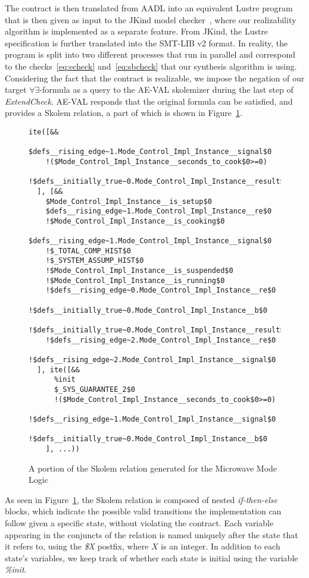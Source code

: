 The contract is then translated from AADL into an equivalent Lustre program that
is then given as input to the JKind model checker~\cite{jkind}, where our
realizability algorithm is implemented as a separate feature. From JKind, the
Lustre specification is further translated into the SMT-LIB v2 format. In
reality, the program is split into two different processes that run in parallel and correspond to the
checks~\ref{eq:echeck} and~\ref{eq:sbcheck} that our synthesis algorithm is
using. Considering the fact that the
contract is realizable, we impose the negation of our target
$\forall\exists$-formula as a query to the AE-VAL skolemizer during the last
step of \textit{ExtendCheck}. AE-VAL responds that the original formula can be
satisfied, and provides a Skolem relation, a part of which is shown in Figure~\ref{fig:skolem-rel}.

\begin{figure}
\begin{Verbatim}[obeytabs,fontsize=\tiny]
ite([&&
    $defs__rising_edge~1.Mode_Control_Impl_Instance__signal$0
    !($Mode_Control_Impl_Instance__seconds_to_cook$0>=0)
    !$defs__initially_true~0.Mode_Control_Impl_Instance__result$0
  ], [&&
    $Mode_Control_Impl_Instance__is_setup$0
    $defs__rising_edge~1.Mode_Control_Impl_Instance__re$0
    !$Mode_Control_Impl_Instance__is_cooking$0
    $defs__rising_edge~1.Mode_Control_Impl_Instance__signal$0
    !$_TOTAL_COMP_HIST$0
    !$_SYSTEM_ASSUMP_HIST$0
    !$Mode_Control_Impl_Instance__is_suspended$0
    !$Mode_Control_Impl_Instance__is_running$0
    !$defs__rising_edge~0.Mode_Control_Impl_Instance__re$0
    !$defs__initially_true~0.Mode_Control_Impl_Instance__b$0
    !$defs__initially_true~0.Mode_Control_Impl_Instance__result$0
    !$defs__rising_edge~2.Mode_Control_Impl_Instance__re$0
    !$defs__rising_edge~2.Mode_Control_Impl_Instance__signal$0
  ], ite([&&
      %init
      $_SYS_GUARANTEE_2$0
      !($Mode_Control_Impl_Instance__seconds_to_cook$0>=0)
      !$defs__rising_edge~1.Mode_Control_Impl_Instance__signal$0
      !$defs__initially_true~0.Mode_Control_Impl_Instance__b$0
    ], ...))
\end{Verbatim}
\caption{A portion of the Skolem relation generated for the Microwave Mode Logic}
\label{fig:skolem-rel}
\end{figure}
As seen in Figure~\ref{fig:skolem-rel}, the Skolem relation is composed of nested
\textit{if-then-else} blocks, which indicate the possible valid transitions the
implementation can follow given a specific state, without
violating the contract. Each variable appearing in the conjuncts of
the relation is named uniquely after the state that it refers to, using the
\textit{\$X} postfix, where $X$ is an integer. In addition to each state's
variables, we keep track of whether each state is initial using the variable
\textit{\%init}.

